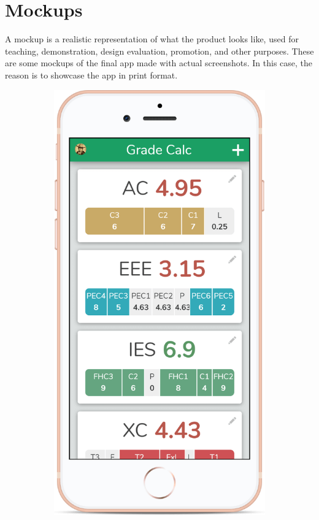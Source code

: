 \clearpage\newpage
\section{Mockups}

A mockup is a realistic representation of what the product looks like, used for teaching, demonstration, design evaluation, promotion, and other purposes. These are some mockups\cite{mockup-tool} of the final app made with actual screenshots. In this case, the reason is to showcase the app in print format.

\vfill
\begin{figure}[ht!]
    \begin{subfigure}[b]{0.3\textwidth-0.1cm}
        \centering
        \includegraphics[width=\textwidth]{media/mockups/mockup-iphone-rosegold.png}

\end{subfigure}
\end{figure}
